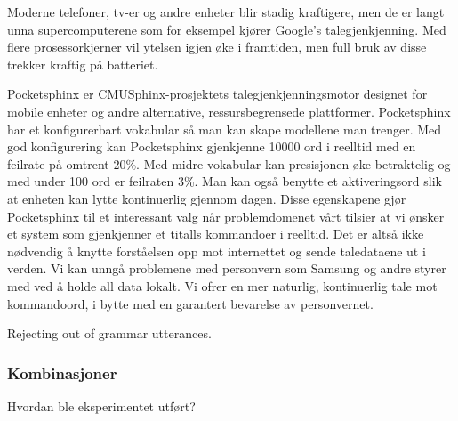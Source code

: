 Moderne telefoner, tv-er og andre enheter blir stadig kraftigere, men de er langt unna supercomputerene som for eksempel kjører Google's talegjenkjenning. Med flere prosessorkjerner vil ytelsen igjen øke i framtiden, men full bruk av disse trekker kraftig på batteriet.

Pocketsphinx er CMUSphinx-prosjektets talegjenkjenningsmotor designet for mobile enheter og andre alternative, ressursbegrensede plattformer. Pocketsphinx har et konfigurerbart vokabular så man kan skape modellene man trenger. Med god konfigurering kan Pocketsphinx gjenkjenne 10000 ord i reelltid med en feilrate på omtrent 20\%. Med midre vokabular kan presisjonen øke betraktelig og med under 100 ord er feilraten 3\%. Man kan også benytte et aktiveringsord slik at enheten kan lytte kontinuerlig gjennom dagen. Disse egenskapene gjør Pocketsphinx til et interessant valg når problemdomenet vårt tilsier at vi ønsker et system som gjenkjenner et titalls kommandoer i reelltid. Det er altså ikke nødvendig å knytte forståelsen opp mot internettet og sende taledataene ut i verden. Vi kan unngå problemene med personvern som Samsung og andre styrer med ved å holde all data lokalt. Vi ofrer en mer naturlig, kontinuerlig tale mot kommandoord, i bytte med en garantert bevarelse av personvernet.

Rejecting out of grammar utterances.

\subsubsection{Kombinasjoner}
{\color{red}Hvordan ble eksperimentet utført?}

